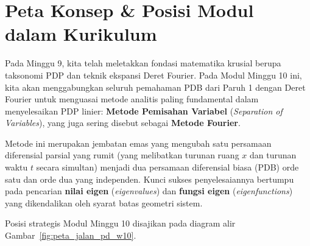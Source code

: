 \documentclass[11pt,a4paper]{article}
\theoremstyle{definition}
\begin{document}
\vspace{0.3cm}
\tableofcontents
\vspace{0.5cm}

\newpage

\section{Peta Konsep \& Posisi Modul dalam Kurikulum}

Pada Minggu 9, kita telah meletakkan fondasi matematika krusial berupa taksonomi PDP dan teknik ekspansi Deret Fourier. Pada Modul Minggu 10 ini, kita akan menggabungkan seluruh pemahaman PDB dari Paruh 1 dengan Deret Fourier untuk menguasai metode analitis paling fundamental dalam menyelesaikan PDP linier: \textbf{Metode Pemisahan Variabel} (\textit{Separation of Variables}), yang juga sering disebut sebagai \textbf{Metode Fourier}.

Metode ini merupakan jembatan emas yang mengubah satu persamaan diferensial parsial yang rumit (yang melibatkan turunan ruang $x$ dan turunan waktu $t$ secara simultan) menjadi dua persamaan diferensial biasa (PDB) orde satu dan orde dua yang independen. Kunci sukses penyelesaiannya bertumpu pada pencarian \textbf{nilai eigen} (\textit{eigenvalues}) dan \textbf{fungsi eigen} (\textit{eigenfunctions}) yang dikendalikan oleh syarat batas geometri sistem.

Posisi strategis Modul Minggu 10 disajikan pada diagram alir Gambar~\ref{fig:peta_jalan_pd_w10}.
\end{document}
